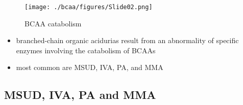 \documentclass{scrartcl}
\begin{document}
\begin{figure}[htbp]
\centering
\texttt{[image: ./bcaa/figures/Slide02.png]}
\caption{\label{fig:org9eafdb0}
BCAA catabolism}
\end{figure}

\begin{itemize}
\item branched-chain organic acidurias result from an abnormality of
specific enzymes involving the catabolism of BCAAs
\item most common are MSUD, IVA, PA, and MMA
\end{itemize}

\subsection{MSUD, IVA, PA and MMA}
\label{sec:org739c88c}
\end{document}
